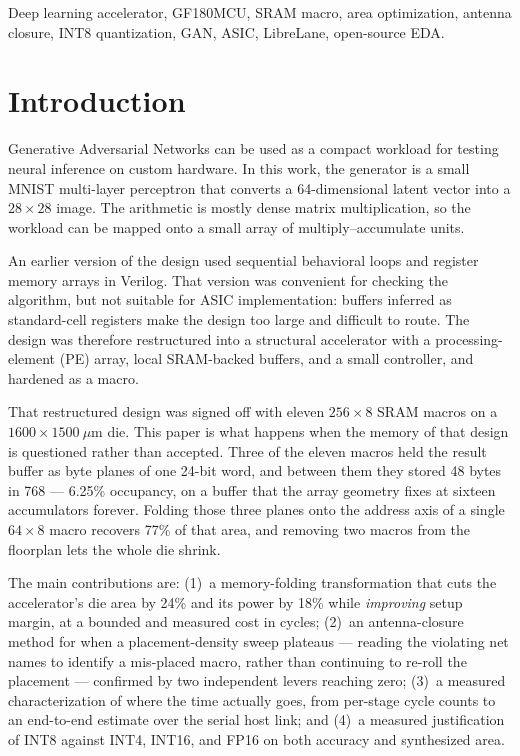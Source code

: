 \documentclass[conference,a4paper]{APSIPA2026}
\begin{document}
\begin{IEEEkeywords}
Deep learning accelerator, GF180MCU, SRAM macro, area optimization, antenna closure, INT8 quantization, GAN, ASIC, LibreLane, open-source EDA.
\end{IEEEkeywords}

\section{Introduction}
Generative Adversarial Networks can be used as a compact workload for testing neural inference on custom hardware. In this work, the generator is a small MNIST multi-layer perceptron that converts a 64-dimensional latent vector into a $28\times28$ image. The arithmetic is mostly dense matrix multiplication, so the workload can be mapped onto a small array of multiply--accumulate units.

An earlier version of the design used sequential behavioral loops and register memory arrays in Verilog. That version was convenient for checking the algorithm, but not suitable for ASIC implementation: buffers inferred as standard-cell registers make the design too large and difficult to route. The design was therefore restructured into a structural accelerator with a processing-element (PE) array, local SRAM-backed buffers, and a small controller, and hardened as a macro.

That restructured design was signed off with eleven $256\times8$ SRAM macros on a $1600\times1500~\mu$m die. This paper is what happens when the memory of that design is questioned rather than accepted. Three of the eleven macros held the result buffer as byte planes of one 24-bit word, and between them they stored 48 bytes in 768 --- 6.25\% occupancy, on a buffer that the array geometry fixes at sixteen accumulators forever. Folding those three planes onto the address axis of a single $64\times8$ macro recovers 77\% of that area, and removing two macros from the floorplan lets the whole die shrink.

The main contributions are: (1)~a memory-folding transformation that cuts the accelerator's die area by 24\% and its power by 18\% while \emph{improving} setup margin, at a bounded and measured cost in cycles; (2)~an antenna-closure method for when a placement-density sweep plateaus --- reading the violating net names to identify a mis-placed macro, rather than continuing to re-roll the placement --- confirmed by two independent levers reaching zero; (3)~a measured characterization of where the time actually goes, from per-stage cycle counts to an end-to-end estimate over the serial host link; and (4)~a measured justification of INT8 against INT4, INT16, and FP16 on both accuracy and synthesized area.
\end{document}
